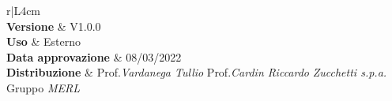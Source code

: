 \begin{center}
	\begin{tabular}{r|L{4cm}}
		 \\
		\hline
		\textbf{Versione}			& V1.0.0 \\
		\textbf{Uso}		& Esterno \\
		\textbf{Data approvazione} 			& 08/03/2022 \\
		\textbf{Distribuzione} 	&	Prof.\textit{Vardanega Tullio} \newline Prof.\textit{Cardin Riccardo} \newline \textit{Zucchetti s.p.a.} \newline Gruppo \textit{MERL} \\
	\end{tabular}
\end{center}
	